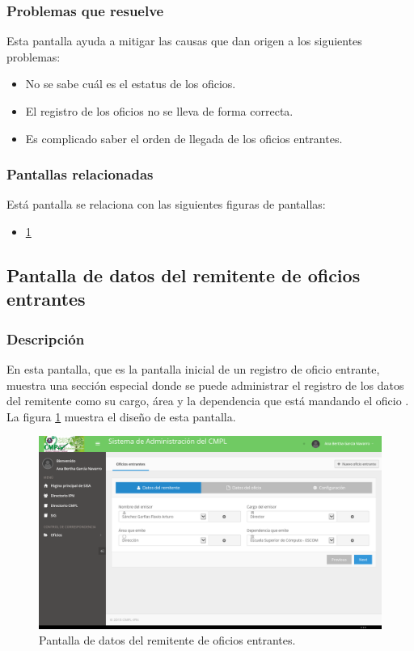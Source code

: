 \subsubsection{Problemas que resuelve}
Esta pantalla ayuda a mitigar las causas que dan origen a los siguientes problemas:

	\begin{itemize}
		\item No se sabe cuál es el estatus de los oficios.
		\item El registro de los oficios no se lleva de forma correcta.
		\item Es complicado saber el orden de llegada de los oficios entrantes.
	\end{itemize}

\subsubsection{Pantallas relacionadas}
Está pantalla se relaciona con las siguientes figuras de pantallas:
	\begin{itemize}
		\item \ref{fig:Wizard1DatosDelRemitente}
	\end{itemize}

\subsection{Pantalla de datos del remitente de oficios entrantes}
\subsubsection{Descripción}
	En esta pantalla, que es la pantalla inicial de un registro de oficio entrante, muestra una sección especial donde se puede administrar el registro de los datos del remitente como su cargo, área y la dependencia que está mandando el oficio . La figura \ref{fig:Wizard1DatosDelRemitente} muestra el diseño de esta pantalla.		
		
	\begin{figure}[htbp!]
		\centering
			\includegraphics[width=1\textwidth]{Pantallas/Wizard1DatosDelRemitente.png}
		\caption{Pantalla de datos del remitente de oficios entrantes.}
		\label{fig:Wizard1DatosDelRemitente}
	\end{figure}

